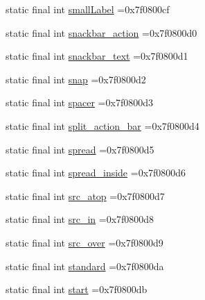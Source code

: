 \begin{DoxyCompactItemize}
\item 
static final int \mbox{\hyperlink{classbr_1_1unb_1_1cic_1_1mp_1_1marketmaster_1_1R_1_1id_a1ab4af604d5a148e9bfecbb0db75bc36}{small\+Label}} =0x7f0800cf
\item 
static final int \mbox{\hyperlink{classbr_1_1unb_1_1cic_1_1mp_1_1marketmaster_1_1R_1_1id_abe5fc710b28321dee786cbb293400f09}{snackbar\+\_\+action}} =0x7f0800d0
\item 
static final int \mbox{\hyperlink{classbr_1_1unb_1_1cic_1_1mp_1_1marketmaster_1_1R_1_1id_a78656f7ffda46036bada798312e40319}{snackbar\+\_\+text}} =0x7f0800d1
\item 
static final int \mbox{\hyperlink{classbr_1_1unb_1_1cic_1_1mp_1_1marketmaster_1_1R_1_1id_a80758a3039874361add6a2550494a9ab}{snap}} =0x7f0800d2
\item 
static final int \mbox{\hyperlink{classbr_1_1unb_1_1cic_1_1mp_1_1marketmaster_1_1R_1_1id_a52bc4b8c20f53b653d4a7aeb2e20d16b}{spacer}} =0x7f0800d3
\item 
static final int \mbox{\hyperlink{classbr_1_1unb_1_1cic_1_1mp_1_1marketmaster_1_1R_1_1id_af29afed1c2903517f20c05b75cf6c319}{split\+\_\+action\+\_\+bar}} =0x7f0800d4
\item 
static final int \mbox{\hyperlink{classbr_1_1unb_1_1cic_1_1mp_1_1marketmaster_1_1R_1_1id_a6a4350e2e6352b921e6220a6d71211b7}{spread}} =0x7f0800d5
\item 
static final int \mbox{\hyperlink{classbr_1_1unb_1_1cic_1_1mp_1_1marketmaster_1_1R_1_1id_afe1de2bba1488950aa0735f39a04ea81}{spread\+\_\+inside}} =0x7f0800d6
\item 
static final int \mbox{\hyperlink{classbr_1_1unb_1_1cic_1_1mp_1_1marketmaster_1_1R_1_1id_a04aad0f8332432c24cd4e7ee44eac9e5}{src\+\_\+atop}} =0x7f0800d7
\item 
static final int \mbox{\hyperlink{classbr_1_1unb_1_1cic_1_1mp_1_1marketmaster_1_1R_1_1id_a521b4abf63e8c5944a893e2415c62bfc}{src\+\_\+in}} =0x7f0800d8
\item 
static final int \mbox{\hyperlink{classbr_1_1unb_1_1cic_1_1mp_1_1marketmaster_1_1R_1_1id_a683c497fbc76190aba0e4797e961b7c4}{src\+\_\+over}} =0x7f0800d9
\item 
static final int \mbox{\hyperlink{classbr_1_1unb_1_1cic_1_1mp_1_1marketmaster_1_1R_1_1id_adec7f76688157a68eee8be9933ef29a5}{standard}} =0x7f0800da
\item 
static final int \mbox{\hyperlink{classbr_1_1unb_1_1cic_1_1mp_1_1marketmaster_1_1R_1_1id_abbb371f8dffa6f06fb01d4a9b533d66c}{start}} =0x7f0800db
\item 

\end{DoxyCompactItemize}
